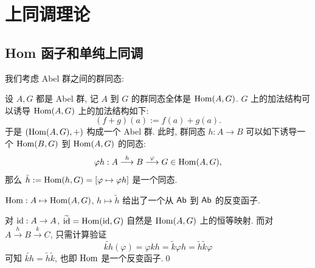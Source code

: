 
\section{上同调理论}

\subsection{Hom 函子和单纯上同调}

我们考虑 Abel 群之间的群同态:

\begin{Definition}[Hom 函子]
	设 $ A, G $ 都是 Abel 群, 记 $ A $ 到 $ G $ 的群同态全体是 $ \mathrm{Hom}(A,G) $. $ G $ 上的加法结构可以诱导 $ \mathrm{Hom}(A,G) $ 上的加法结构如下:
	\[
		(f+g)(a):=f(a)+g(a).
	\]
	于是 $ (\mathrm{Hom}(A,G),+) $ 构成一个 Abel 群. 此时, 群同态 $ h : A\to B $ 可以如下诱导一个 $ \mathrm{Hom}(B,G) $ 到 $ \mathrm{Hom}(A,G) $ 的同态:
	\[
		\varphi h : A\stackrel{h}{\longrightarrow}B\stackrel{\varphi}{\longrightarrow}G\in\mathrm{Hom}(A,G),
	\]
	那么 $ \tilde{h}:=\mathrm{Hom}(h,G)=[\varphi\mapsto\varphi h] $ 是一个同态.
\end{Definition}

\begin{Proposition}
	$ \mathrm{Hom} : A\mapsto\mathrm{Hom}(A,G) $, $ h\mapsto \tilde{h} $ 给出了一个从 $ \mathsf{Ab} $ 到 $ \mathsf{Ab} $ 的反变函子.
\end{Proposition}
\begin{Proof}
	对 $ \mathrm{id} : A\to A $, $ \widetilde{\mathrm{id}}=\mathrm{Hom}(\mathrm{id},G) $ 自然是 $ \mathrm{Hom}(A,G) $ 上的恒等映射. 而对 $ A\stackrel{h}{\to}B\stackrel{k}{\to}C $, 只需计算验证
	\[
		\widetilde{kh}(\varphi)=\varphi k h=\tilde{k}\varphi h=\tilde{h}\tilde{k}\varphi
	\]
	可知 $ \widetilde{kh}=\tilde{h}\tilde{k} $, 也即 $ \mathrm{Hom} $ 是一个反变函子.\qed
\end{Proof}

